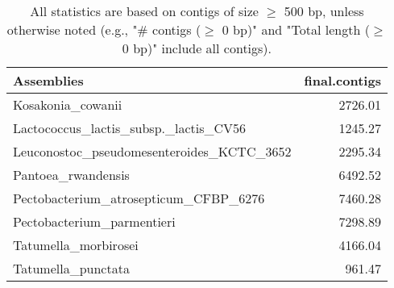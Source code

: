 \documentclass[12pt,a4paper]{article}
\begin{document}
\begin{table}[ht]
\begin{center}
\caption{All statistics are based on contigs of size $\geq$ 500 bp, unless otherwise noted (e.g., "\# contigs ($\geq$ 0 bp)" and "Total length ($\geq$ 0 bp)" include all contigs).}
\begin{tabular}{|l*{1}{|r}|}
\hline
Assemblies & final.contigs \\ \hline
Kosakonia\_cowanii & 2726.01 \\ \hline
Lactococcus\_lactis\_subsp.\_lactis\_CV56 & 1245.27 \\ \hline
Leuconostoc\_pseudomesenteroides\_KCTC\_3652 & 2295.34 \\ \hline
Pantoea\_rwandensis & 6492.52 \\ \hline
Pectobacterium\_atrosepticum\_CFBP\_6276 & 7460.28 \\ \hline
Pectobacterium\_parmentieri & 7298.89 \\ \hline
Tatumella\_morbirosei & 4166.04 \\ \hline
Tatumella\_punctata & 961.47 \\ \hline
\end{tabular}
\end{center}
\end{table}
\end{document}
